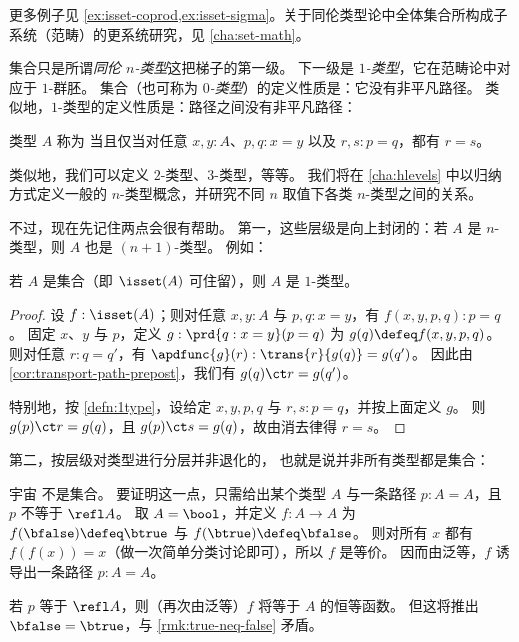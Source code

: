 更多例子见 \cref{ex:isset-coprod,ex:isset-sigma}。关于同伦类型论中全体集合所构成子系统（范畴）的更系统研究，见 \cref{cha:set-math}。

%

集合只是所谓\emph{同伦 $n$-类型}这把梯子的第一级。
下一级是 \emph{$1$-类型}，它在范畴论中对应于 $1$-群胚。
集合（也可称为 \emph{$0$-类型}）的定义性质是：它没有非平凡路径。
类似地，$1$-类型的定义性质是：路径之间没有非平凡路径：

\begin{defn}\label{defn:1type}
  类型 $A$ 称为 
  当且仅当对任意 $x,y:A$、$p,q:x=y$ 以及 $r,s:p=q$，都有 $r=s$。
\end{defn}

类似地，我们可以定义 $2$-类型、$3$-类型，等等。
我们将在 \cref{cha:hlevels} 中以归纳方式定义一般的 $n$-类型概念，并研究不同 $n$ 取值下各类 $n$-类型之间的关系。

不过，现在先记住两点会很有帮助。
第一，这些层级是向上封闭的：若 $A$ 是 $n$-类型，则 $A$ 也是 $(n+1)$-类型。
例如：

\begin{lem}\label{thm:isset-is1type}
  若 $A$ 是集合（即 $\isset(A)$ 可住留），则 $A$ 是 $1$-类型。
\end{lem}
\begin{proof}
  设 $f:\isset(A)$；则对任意 $x,y:A$ 与 $p,q:x=y$，有 $f(x,y,p,q):p=q$。
  固定 $x$、$y$ 与 $p$，定义 $g: \prd{q:x=y} (p=q)$ 为 $g(q) \defeq f (x,y,p,q)$。
  则对任意 $r:q=q'$，有 $\apdfunc{g}(r) : \trans{r}{g(q)} = g(q')$。
  因此由 \cref{cor:transport-path-prepost}，我们有 $g(q) \ct r = g(q')$。

  特别地，按 \cref{defn:1type}，设给定 $x,y,p,q$ 与 $r,s:p=q$，并按上面定义 $g$。
  则 $g(p) \ct r = g(q)$，且 $g(p) \ct s = g(q)$，故由消去律得 $r=s$。
\end{proof}

第二，按层级对类型进行分层并非退化的，
也就是说并非所有类型都是集合：

\begin{eg}\label{thm:type-is-not-a-set}
  宇宙 \type 不是集合。
  要证明这一点，只需给出某个类型 $A$ 与一条路径 $p:A=A$，且 $p$ 不等于 $\refl A$。
  取 $A=\bool$，并定义 $f:A\to A$ 为 $f(\bfalse)\defeq \btrue$ 与 $f(\btrue)\defeq \bfalse$。
  则对所有 $x$ 都有 $f(f(x))=x$（做一次简单分类讨论即可），所以 $f$ 是等价。
  因而由泛等，$f$ 诱导出一条路径 $p:A=A$。

  若 $p$ 等于 $\refl A$，则（再次由泛等）$f$ 将等于 $A$ 的恒等函数。
  但这将推出 $\bfalse=\btrue$，与 \cref{rmk:true-neq-false} 矛盾。
\end{eg}


